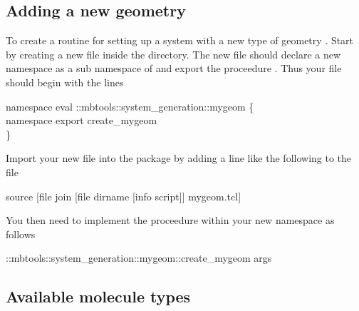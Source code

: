 \subsection{Adding a new geometry}

To create a routine for setting up a system with a new type of
geometry . Start by creating a new file
 inside the 
directory. The new file should declare a new namespace  as
a sub namespace of 
and export the proceedure . Thus your
 file should begin with the lines

\begin{code}
  namespace eval ::mbtools::system\_generation::mygeom \{\\
    namespace export create_mygeom\\
  \}\\
\end{code}  

Import your new file into the  package by
adding a line like the following to the
 file

\begin{code}
  source [file join [file dirname [info script]] mygeom.tcl]
\end{code}


You then need to implement the  proceedure
within your new namespace as follows
\begin{code}
  ::mbtools::system_generation::mygeom::create_mygeom { args }
\end{code}



\subsection{Available molecule types}

